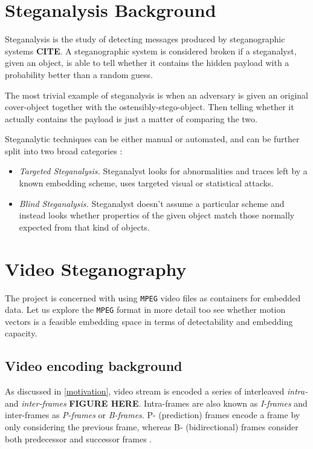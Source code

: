 \documentclass[12pt,british,twoside,notitlepage,usenames,dvipsnames,hypens,final]{report}
\numberwithin{equation}{section}
\numberwithin{figure}{section}
\begin{document}
\section{Steganalysis Background}

Steganalysis is the study of detecting messages produced by steganographic systems \textbf{CITE}. A steganographic system is considered broken if a steganalyst, given an object, is able to tell whether it contains the hidden payload with a probability better than a random guess. 

The most trivial example of steganalysis is when an adversary is given an original cover-object together with the ostensibly-stego-object. Then telling whether it actually contains the payload is just a matter of comparing the two. 

Steganalytic techniques can be either manual or automated, and can be further split into two broad categories \cite{bateman}:
\begin{itemize}
\item \emph{Targeted Steganalysis.} Steganalyst looks for abnormalities and traces left by a known embedding scheme, uses targeted visual or statistical attacks.
\item \emph{Blind Steganalysis.} Steganalyst doesn't assume a particular scheme and instead looks whether properties of the given object match those normally expected from that kind of objects. 
\end{itemize} 

\section{Video Steganography}

The project is concerned with using \texttt{MPEG} video files as containers for embedded data. Let us explore the \texttt{MPEG} format in more detail too see whether motion vectors is a feasible embedding space in terms of detectability and embedding capacity.  

\subsection{Video encoding background}

As discussed in \ref{motivation}, video stream is encoded a series of interleaved \emph{intra-} and \emph{inter-frames} \textbf{FIGURE HERE}. Intra-frames are also known as \emph{I-frames} and inter-frames as \emph{P-frames} or \emph{B-frames}. P- (prediction) frames encode a frame by only considering the previous frame, whereas B- (bidirectional) frames consider both predecessor and successor frames \cite{h264-std}.
\end{document}
